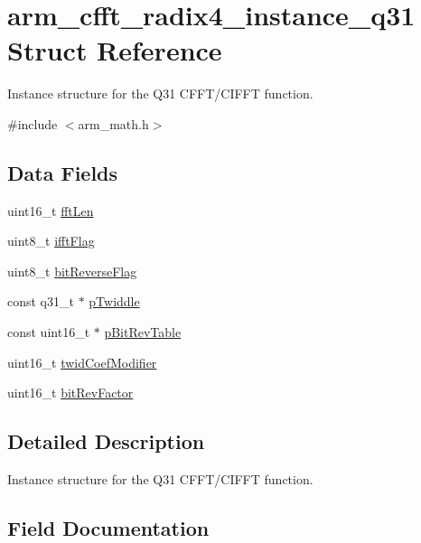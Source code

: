 \hypertarget{structarm__cfft__radix4__instance__q31}{}\section{arm\+\_\+cfft\+\_\+radix4\+\_\+instance\+\_\+q31 Struct Reference}
\label{structarm__cfft__radix4__instance__q31}


Instance structure for the Q31 C\+F\+F\+T/\+C\+I\+F\+FT function.  




{\ttfamily \#include $<$arm\+\_\+math.\+h$>$}

\subsection*{Data Fields}
\begin{DoxyCompactItemize}
\item 
uint16\+\_\+t \mbox{\hyperlink{structarm__cfft__radix4__instance__q31_ab8db3bbe7c61e6bb8ca2a55e3446e11a}{fft\+Len}}
\item 
uint8\+\_\+t \mbox{\hyperlink{structarm__cfft__radix4__instance__q31_ad6ca6e223f986ebfd94c5ee1e410aa73}{ifft\+Flag}}
\item 
uint8\+\_\+t \mbox{\hyperlink{structarm__cfft__radix4__instance__q31_a09a221a818c6d0e064557a99e2fe9a8b}{bit\+Reverse\+Flag}}
\item 
const q31\+\_\+t $\ast$ \mbox{\hyperlink{structarm__cfft__radix4__instance__q31_a9760c603af5d85652496dbffd63a8a2e}{p\+Twiddle}}
\item 
const uint16\+\_\+t $\ast$ \mbox{\hyperlink{structarm__cfft__radix4__instance__q31_a3b229432d381b0a511a9cdbe3aa74e78}{p\+Bit\+Rev\+Table}}
\item 
uint16\+\_\+t \mbox{\hyperlink{structarm__cfft__radix4__instance__q31_afe772e5b5001c9d8e85032115a8df5bf}{twid\+Coef\+Modifier}}
\item 
uint16\+\_\+t \mbox{\hyperlink{structarm__cfft__radix4__instance__q31_a33386d95319dc3ee7097b3a8e52e01ec}{bit\+Rev\+Factor}}
\end{DoxyCompactItemize}


\subsection{Detailed Description}
Instance structure for the Q31 C\+F\+F\+T/\+C\+I\+F\+FT function. 

\subsection{Field Documentation}
\mbox{\label{structarm__cfft__radix4__instance__q31_a09a221a818c6d0e064557a99e2fe9a8b}} 
